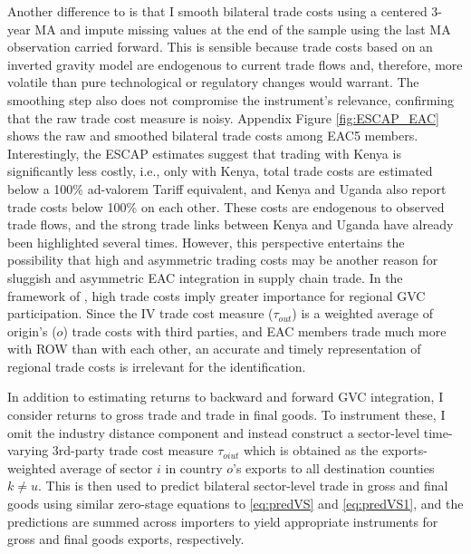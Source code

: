 \documentclass[a4paper]{article}
\begin{document}
Another difference to \citet{Kummritz20161} is that I smooth bilateral trade costs using a centered 3-year MA and impute missing values at the end of the sample using the last MA observation carried forward. This is sensible because trade costs based on an inverted gravity model are endogenous to current trade flows and, therefore, more volatile than pure technological or regulatory changes would warrant. The smoothing step also does not compromise the instrument's relevance, confirming that the raw trade cost measure is noisy. Appendix Figure \ref{fig:ESCAP_EAC} shows the raw and smoothed bilateral trade costs among EAC5 members. Interestingly, the   ESCAP estimates suggest that trading with Kenya is significantly less costly, i.e., only with Kenya, total trade costs are estimated below a 100\% ad-valorem Tariff equivalent, and Kenya and Uganda also report trade costs below 100\% on each other. These costs are endogenous to observed trade flows, and the strong trade links between Kenya and Uganda have already been highlighted several times. However, this perspective entertains the possibility that high and asymmetric trading costs may be another reason for sluggish and asymmetric EAC integration in supply chain trade. In the framework of \citet{antras2020geography}, high trade costs imply greater importance for regional GVC participation. Since the IV trade cost measure ($\tau_{out}$) is a weighted average of origin's ($o$) trade costs with third parties, and EAC members trade much more with ROW than with each other, an accurate and timely representation of regional trade costs is irrelevant for the identification. \newline

In addition to estimating returns to backward and forward GVC integration, I consider returns to gross trade and trade in final goods. To instrument these, I omit the industry distance component and instead construct a sector-level time-varying 3rd-party trade cost measure $\tau_{oiut}$ which is obtained as the exports-weighted average of sector $i$ in country $o$'s exports to all destination counties $k \neq u$. This is then used to predict bilateral sector-level trade in gross and final goods using similar zero-stage equations to \ref{eq:predVS} and \ref{eq:predVS1}, and the predictions are summed across importers to yield appropriate instruments for gross and final goods exports, respectively. \newline 
\end{document}
